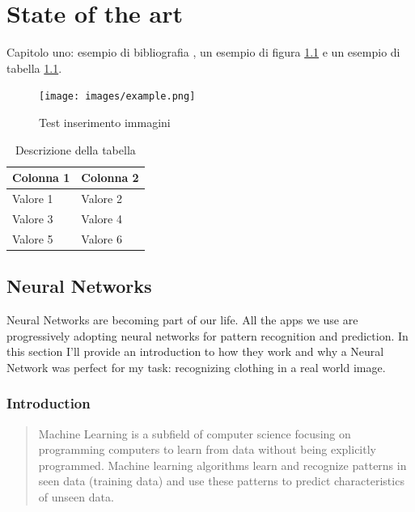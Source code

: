 \chapter{State of the art}
\label{stato dell'arte}


Capitolo uno: 
esempio di bibliografia \cite{2015arXiv150200046K}, un esempio di figura \ref{figure:test inserimento} e un esempio di tabella \ref{table:esempio_tabella}.

\begin{figure}[H]
	\centering
	\texttt{[image: images/example.png]}
	\caption{Test inserimento immagini}
	\label{figure:test inserimento}
\end{figure}

\begin{table}[!htbp]
	\centering
	\begin{tabular}{l|l}
		\toprule
		Colonna 1 & Colonna 2 \\
		\midrule
		Valore 1 & Valore 2 \\
		Valore 3 & Valore 4 \\
		Valore 5 & Valore 6 \\
		\bottomrule
	\end{tabular}
	\caption{Descrizione della tabella}
	\label{table:esempio_tabella}
\end{table}


\section{Neural Networks}\label{s:fundamentals}

Neural Networks are becoming part of our life. All the apps we use are progressively adopting neural networks for pattern recognition and prediction.
In this section I'll provide an introduction to how they work and why a Neural Network was perfect for my task: recognizing clothing in a real world image.

\subsection{Introduction}\label{s:fund-intro}
\begin{quotation}
Machine Learning is a subfield of computer science focusing on programming computers to learn from data without being explicitly programmed. Machine learning algorithms learn and recognize patterns in seen data (training data) and use these patterns to predict characteristics of unseen data. \cite{IntroductiontoMachineLearningAlanZhengSeptember2018}
\end{quotation}

